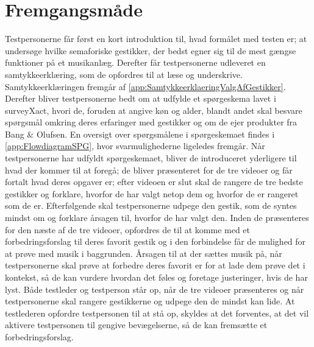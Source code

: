 \section{Fremgangsmåde}
\label{FremgangsmaadeValgAfGestikker}
%
Testpersonerne får først en kort introduktion til, hvad formålet med testen er; at undersøge hvilke semaforiske gestikker, der bedst egner sig til de mest gængse funktioner på et musikanlæg. Derefter får testpersonerne udleveret en samtykkeerklæring, som de opfordres til at læse og underskrive. Samtykkeerklæringen fremgår af \autoref{app:SamtykkeerklaeringValgAfGestikker}. Derefter bliver testpersonerne bedt om at udfylde et spørgeskema lavet i surveyXact, hvori de, foruden at angive køn og alder, blandt andet skal besvare spørgsmål omkring deres erfaringer med gestikker og om de ejer produkter fra Bang $\&$ Olufsen. En oversigt over spørgsmålene i spørgeskemaet findes i \autoref{app:FlowdiagramSPG}, hvor svarmulighederne ligeledes fremgår. Når testpersonerne har udfyldt spørgeskemaet, bliver de introduceret yderligere til hvad der kommer til at foregå; de bliver præsenteret for de tre videoer og får fortalt hvad deres opgaver er; efter videoen er slut skal de rangere de tre bedste gestikker og forklare, hvorfor de har valgt netop dem og hvorfor de er rangeret som de er. Efterfølgende skal testpersonerne udpege den gestik, som de syntes mindst om og forklare årsagen til, hvorfor de har valgt den. Inden de præsenteres for den næste af de tre videoer, opfordres de til at komme med et forbedringsforslag til deres favorit gestik og i den forbindelse får de mulighed for at prøve med musik i baggrunden. Årsagen til at der sættes musik på, når testpersonerne skal prøve at forbedre deres favorit er for at lade dem prøve det i kontekst, så de kan vurdere hvordan det føles og foretage justeringer, hvis de har lyst. Både testleder og testperson står op, når de tre videoer præsenteres og når testpersonerne skal rangere gestikkerne og udpege den de mindst kan lide. At testlederen opfordre testpersonen til at stå op, skyldes at det forventes, at det vil aktivere testpersonen til gengive bevægelserne, så de kan fremsætte et forbedringsforslag. 

